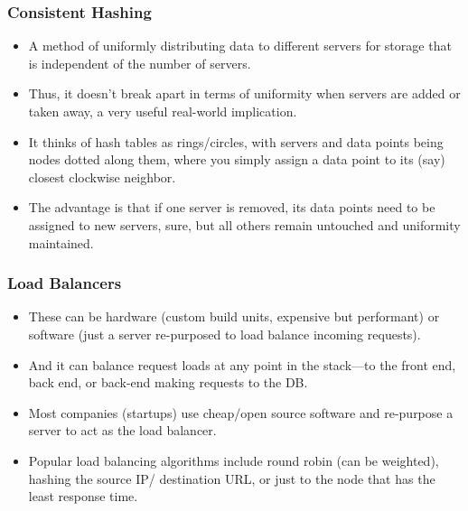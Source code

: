 \begin{frame}
	\frametitle{Consistent Hashing}
		
			\begin{itemize}
				\item A method of uniformly distributing data to different servers for 
storage that is independent of the number of servers. 
				\item Thus, it doesn’t break apart in terms of uniformity when servers are added or taken away, a very useful real-world implication. 
				\item It thinks of hash tables as rings/circles, with servers and data points being nodes dotted along them, where you simply assign a data point to its (say) closest clockwise neighbor. 
				\item The advantage is that if one server is removed, its data points need to be assigned to new servers, sure, but all others remain untouched and uniformity maintained.

			\end{itemize}		
\end{frame}

\begin{frame}
	\frametitle{Load Balancers}
		
			\begin{itemize}
				\item These can be hardware (custom build units, expensive but performant) or software (just a server 
re-purposed to load balance incoming requests). 
				\item And it can balance request loads at any point in the stack—to the front end, back end, or back-end making requests to the DB. 
				\item Most companies (startups) use cheap/open source software and re-purpose a server to act as the load balancer. 
				\item Popular load balancing algorithms include round robin (can be weighted), hashing the source IP/
destination URL, or just to the node that has the least response time.
			\end{itemize}		
\end{frame}